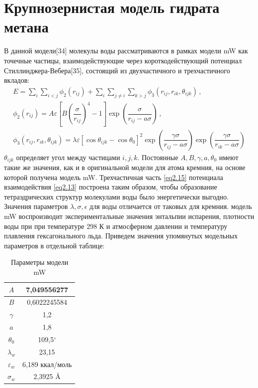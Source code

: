 \section{Крупнозернистая модель гидрата метана}
В данной модели[34] молекулы воды рассматриваются в рамках модели mW как точечные частицы, взаимодействующие через короткодействующий потенциал Стиллинджера-Вебера[35], состоящий из двухчастичного и трехчастичного вкладов:
\begin{gather}
    E = \sum\limits_{i}\sum\limits_{i<j}\phi_2(r_{ij}) + \sum\limits_{i}\sum\limits_{j\neq i}\sum\limits_{k>j}\phi_3(r_{ij},r_{ik},\theta_{ijk})\,, \label{eq2.13} \\
    \phi_2(r_{ij}) = A\varepsilon\left[B\left(\dfrac{\sigma}{r_{ij}}\right)^4 -1\right]\exp\left(\dfrac{\sigma}{r_{ij}-a\sigma}\right)\,,
    \label{eq2.14} \\
    \phi_3(r_{ij},r_{ik},\theta_{ijk}) = \lambda\varepsilon{[\cos{\theta_{ijk}}-\cos{\theta_0}]}^2\exp{\left(\dfrac{\gamma\sigma}{r_{ij}-a\sigma}\right)}\exp{\left(\dfrac{\gamma\sigma}{r_{ik}-a\sigma}\right)}
    \label{eq2.15}
\end{gather}
$\theta_{ijk}$ определяет угол между частицами $i,j,k$. Постоянные $A, B, \gamma, a, \theta_0$ имеют такие же значения, как и в оригинальной модели для атома кремния, на основе которой получена модель mW. Трехчастичная часть \eqref{eq2.15} потенциала взаимодействия \eqref{eq2.13} построена таким образом, чтобы образование тетраэдрических структур молекулами воды было энергетически выгодно. Значения параметров $\lambda, \sigma, \epsilon$ для воды отличается от таковых для кремния. модель mW воспроизводит экспериментальные значения энтальпии испарения, плотности воды при при температуре 298 К и атмосферном давлении и температуру плавления гексагонального льда. Приведем значения упомянутых модельных параметров в отдельной таблице:

\begin{table}[H]
    \centering
    \caption{Параметры модели mW}
    \renewcommand{\arraystretch}{1.5}
    \begin{tabular}{c|c}
        $A$             & 7,049556277       \\ \hline
        $B$             & 0,6022245584      \\ \hline
        $\gamma$        & 1,2               \\ \hline
        $a$             & 1,8               \\ \hline
        $\theta_0$      & 109,5$^{\circ}$   \\ \hline
        $\lambda_w$       & 23,15             \\ \hline
        $\varepsilon_w$ & 6,189 ккал/моль   \\ \hline
        $\sigma_w$      & 2,3925 $\si{\angstrom}$
        \end{tabular}
    \label{table3}
\end{table}


